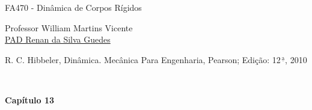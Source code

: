 \documentclass[a4paper,12pt]{article}
\begin{document}
	\begin{center}
		\begin{huge}
			FA470 - Dinâmica de Corpos Rígidos\\\vspace{1cm}
		\end{huge}
		\begin{large}
			Professor William Martins Vicente\\\vspace{.5cm}
			\href{https://github.com/renanGuedes10/}{PAD Renan da Silva Guedes}\\\vspace{1cm}
		\end{large}
		\begin{Large}
			R. C. Hibbeler, Dinâmica. Mecânica Para Engenharia, Pearson; Edição: 12$^{\,\underline{\text{a}}}$, 2010
		\end{Large}\\\vspace{1cm}
		\begin{large}
			\textbf{Capítulo 13}
		\end{large}
	\end{center} 
\end{document}

